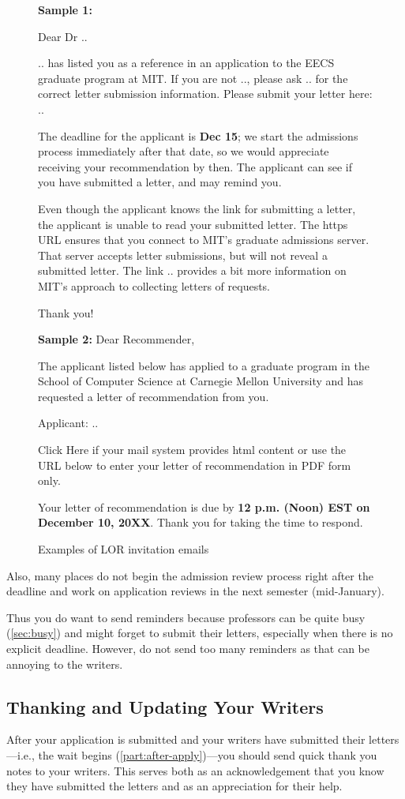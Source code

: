 \documentclass[oneside,11pt]{book}
\newenvironment{examplebox}[1][]{
  \small
  \begin{marker}[\faChessBishop{}]
    {\textbf{#1}}
  }{
  \end{marker}
}
\begin{document}
\begin{figure}
\begin{examplebox}
    \textbf{Sample 1:}
    
    Dear Dr ..
    
    .. has listed you as a reference in an application to the EECS graduate program at MIT. If you are not .., please ask .. for the correct letter submission information. Please submit your letter here: ..
    
    The deadline for the applicant is \textbf{Dec 15}; we start the admissions process immediately after that date, so we would appreciate receiving your recommendation by then. The applicant can see if you have submitted a letter, and may remind you.
    
    Even though the applicant knows the link for submitting a letter, the applicant is unable to read your submitted letter. The https URL ensures that you connect to MIT's graduate admissions server. That server accepts letter submissions, but will not reveal a submitted letter. The link .. provides a bit more information on MIT's approach to collecting letters of requests.
    
    Thank you!
    
    \textbf{Sample 2:}
    Dear Recommender,
    
    The applicant listed below has applied to a graduate program in the School of Computer Science at Carnegie Mellon University and has requested a letter of recommendation from you.
    
    Applicant: ..
    
    Click Here if your mail system provides html content or use the URL below to enter your letter of recommendation in PDF form only.
    
    Your letter of recommendation is due by \textbf{12 p.m. (Noon) EST on December 10, 20XX}. Thank you for taking the time to respond.
\end{examplebox}
\caption{Examples of LOR invitation emails}\label{fig:lor-invitations}
\end{figure}


Also, many places do not begin the admission review process right after the deadline and work on application reviews in the next semester (mid-January). 

Thus you do want to send reminders because professors can be quite busy (\autoref{sec:busy}) and might forget to submit their letters, especially when there is no explicit deadline. However, do not send too many reminders as that can be annoying to the writers.

\subsection{Thanking and Updating Your Writers}\label{sec:thank-writers}
After your application is submitted and your writers have submitted their letters---i.e., the wait begins (\autoref{part:after-apply})---you should send quick thank you notes to your writers.  This  serves both as an acknowledgement that you know they have submitted the letters and as an appreciation for their help.
\end{document}
